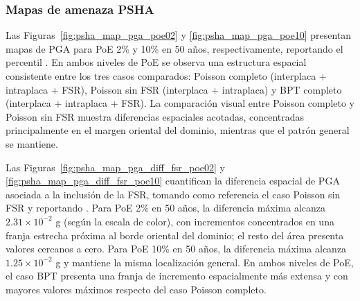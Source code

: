 \subsubsection{Mapas de amenaza PSHA}
\label{subsubsec:psha_mapas}

Las Figuras~\ref{fig:psha_map_pga_poe02} y \ref{fig:psha_map_pga_poe10} presentan mapas de PGA para PoE 2\% y 10\% en 50 años, respectivamente, reportando el percentil \pFifty{}. En ambos niveles de PoE se observa una estructura espacial consistente entre los tres casos comparados: Poisson completo (interplaca + intraplaca + FSR), Poisson sin FSR (interplaca + intraplaca) y BPT completo (interplaca + intraplaca + FSR). La comparación visual entre Poisson completo y Poisson sin FSR muestra diferencias espaciales acotadas, concentradas principalmente en el margen oriental del dominio, mientras que el patrón general se mantiene.

Las Figuras~\ref{fig:psha_map_pga_diff_fsr_poe02} y \ref{fig:psha_map_pga_diff_fsr_poe10} cuantifican la diferencia espacial de PGA asociada a la inclusión de la FSR, tomando como referencia el caso Poisson sin FSR y reportando \pFifty{}. Para PoE 2\% en 50 años, la diferencia máxima alcanza $2.31\times10^{-2}$ g (según la escala de color), con incrementos concentrados en una franja estrecha próxima al borde oriental del dominio; el resto del área presenta valores cercanos a cero. Para PoE 10\% en 50 años, la diferencia máxima alcanza $1.25\times10^{-2}$ g y mantiene la misma localización general. En ambos niveles de PoE, el caso BPT presenta una franja de incremento espacialmente más extensa y con mayores valores máximos respecto del caso Poisson completo.

